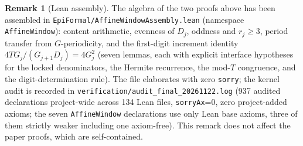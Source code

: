 \documentclass[11pt]{amsart}
\theoremstyle{definition}
\newtheorem{remark}[theorem]{Remark}
\theoremstyle{remark}
\numberwithin{equation}{section}
\begin{document}
\begin{remark}[Lean assembly]\label{rem:affine-assembly}
The algebra of the two proofs above has been assembled in
\texttt{EpiFormal/AffineWindowAssembly.lean} (namespace \texttt{AffineWindow}):
content arithmetic, evenness of $D_j$, oddness and $r_j\ge3$,
period transfer from $G$-periodicity, and the first-digit increment
identity $4T G_j/(G_{j+1}D_j)=4G_j^2$ (seven lemmas, each with explicit
interface hypotheses for the locked denominators, the Hermite recurrence,
the mod-$T$ congruence, and the digit-determination rule).
The file elaborates with zero \texttt{sorry}; the kernel audit is recorded in
\texttt{verification/\allowbreak audit\_\allowbreak final\_\allowbreak 20261122.log}
(937 audited declarations project-wide across 134 Lean files, \texttt{sorryAx}=0, zero project-added axioms;
the seven \texttt{AffineWindow} declarations use only Lean base axioms, three of them strictly weaker including one axiom-free).
This remark does not affect the paper proofs, which are self-contained.
\end{remark}
\end{document}
